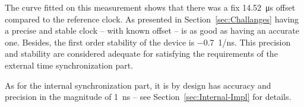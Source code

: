 \documentclass[journal]{IEEEtran}
\begin{document}
The curve fitted on this measurement shows that there was a fix \SI{14.52}{\micro\second} offset compared to the
reference clock. As presented in Section~\ref{sec:Challanges}
having a precise and stable clock -- with known offset -- is as good as having an accurate one. Besides,
the first order stability of the
device is \SI{-0.7}{1/\nano\second}. This precision and stability are considered adequate for satisfying the
requirements of the external time synchronization part.

As for the internal synchronization part, it is by design has accuracy and precision in the magnitude of \SI{1}{\nano\second} -- see Section~\ref{sec:Internal-Impl} for details.%

%


\end{document}
